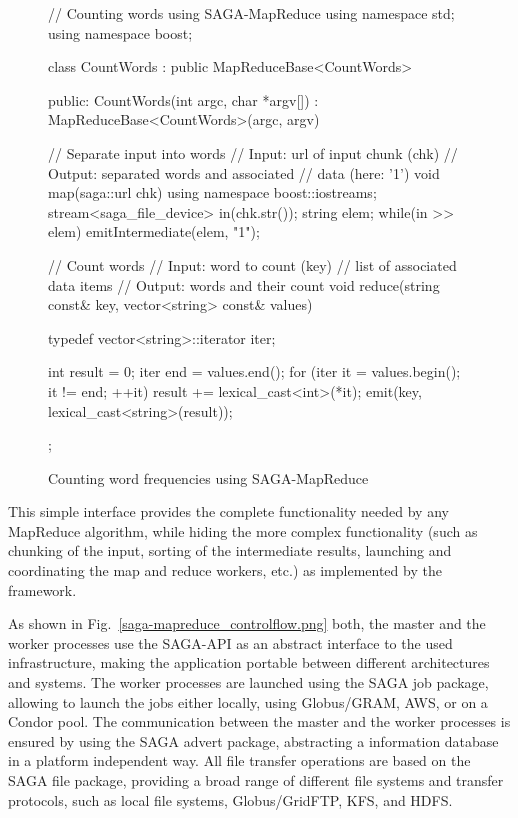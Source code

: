 \documentclass[conference,final]{IEEEtran}
\begin{document}
\begin{figure}[!ht]
 \begin{center}
  \begin{mycode}[label=SAGA MapReduce Word Count Algorithm]
  // Counting words using SAGA-MapReduce
  using namespace std;
  using namespace boost;

  class CountWords 
    : public MapReduceBase<CountWords> {
  public:
    CountWords(int argc, char *argv[]) 
      : MapReduceBase<CountWords>(argc, argv) 
    {}

    // Separate input into words
    // Input:  url of input chunk (chk)
    // Output: separated words and associated 
    //         data (here: '1')
    void map(saga::url chk) {
      using namespace boost::iostreams;
      stream<saga_file_device> in(chk.str());
      string elem;
      while(in >> elem) 
        emitIntermediate(elem, "1");
    } 

    // Count words
    // Input:  word to count (key)
    //         list of associated data items
    // Output: words and their count
    void reduce(string const& key, 
      vector<string> const& values) {
      typedef vector<string>::iterator iter;

      int result = 0;
      iter end = values.end();
      for (iter it = values.begin(); 
           it != end; ++it) {
        result += lexical_cast<int>(*it);
      }
      emit(key, lexical_cast<string>(result));
    }
  };
  \end{mycode}
  \caption{\label{src:saga-mapreduce}
    Counting word frequencies using SAGA-MapReduce}
 \end{center}
\end{figure}

This simple interface provides the complete functionality needed by any
MapReduce algorithm, while hiding the more complex functionality (such as
chunking of the input, sorting of the intermediate results, launching and
coordinating the map and reduce workers, etc.) as implemented by the 
framework.

As shown in Fig.~\ref{saga-mapreduce_controlflow.png} both, the master and 
the worker processes use the SAGA-API as an abstract interface to the 
used infrastructure, making the application portable between different 
architectures and systems. The worker processes are launched using the SAGA
job package, allowing to launch the jobs either locally, using Globus/GRAM, AWS,
or on a Condor pool. The communication between the master and the worker 
processes is ensured by using the SAGA advert package, abstracting a 
information database in a platform independent way. All file transfer
operations are based on the SAGA file package, providing a broad range of
different file systems and transfer protocols, such as local file systems, 
Globus/GridFTP, KFS, and HDFS.
\end{document}
